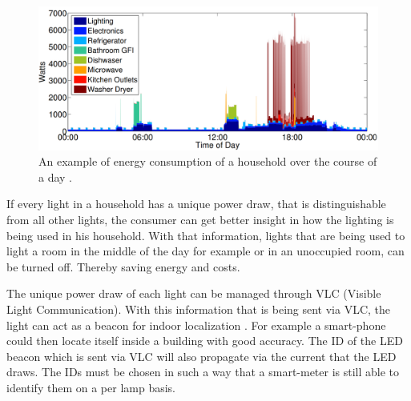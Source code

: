 \begin{figure}[t]
	\centering
	\includegraphics[width=\textwidth]{chapters/introduction-chapters/energy-consumption-house.png}
	\caption{An example of energy consumption of a household over the course of a day \cite{kolter2011redd}.}
	\label{fig:energy-consumption-house}
\end{figure}




If every light in a household has a unique power draw, that is distinguishable from all other lights, the consumer can get better insight in how the lighting is being used in his household. 
With that information, lights that are being used to light a room in the middle of the day for example or in an unoccupied room, can be turned off.
Thereby saving energy and costs.


The unique power draw of each light can be managed through VLC (Visible Light Communication).
With this information that is being sent via VLC, the light can act as a beacon for indoor localization \cite{Kuo:2014:LIP:2639108.2639109}.
For example a smart-phone could then locate itself inside a building with good accuracy.
The ID of the LED beacon which is sent via VLC will also propagate via the current that the LED draws.
The IDs must be chosen in such a way that a smart-meter is still able to identify them on a per lamp basis.




















